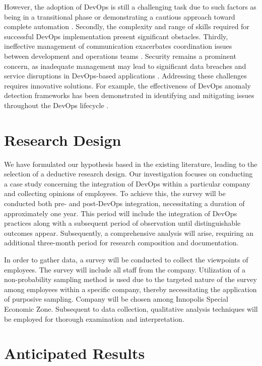\documentclass[oneside,final,12pt,a4paper]{extreport}
\begin{document}
However, the adoption of DevOps is still a challenging task due to such factors as being in a transitional phase or demonstrating a cautious approach toward complete automation \cite{12}. Secondly, the complexity and range of skills required for successful DevOps implementation present significant obstacles. Thirdly, ineffective management of communication exacerbates coordination issues between development and operations teams \cite{7}. Security remains a prominent concern, as inadequate management may lead to significant data breaches and service disruptions in DevOps-based applications \cite{14}. Addressing these challenges requires innovative solutions. For example, the effectiveness of DevOps anomaly detection frameworks has been demonstrated in identifying and mitigating issues throughout the DevOps lifecycle \cite{13}.

\section{Research Design}

We have formulated our hypothesis based in the existing literature, leading to the selection of a deductive research design. Our investigation focuses on conducting a case study concerning the integration of DevOps within a particular company and collecting opinions of employees. To achieve this, the survey will be conducted both pre- and post-DevOps integration, necessitating a duration of approximately one year. This period will include the integration of DevOps practices along with a subsequent period of observation until distinguishable outcomes appear. Subsequently, a comprehensive analysis will arise, requiring an additional three-month period for research composition and documentation.

In order to gather data, a survey will be conducted to collect the viewpoints of employees. The survey will include all staff from the company. Utilization of a non-probability sampling method is used due to the targeted nature of the survey among employees within a specific company, thereby necessitating the application of purposive sampling. Company will be chosen among Innopolis Special Economic Zone. Subsequent to data collection, qualitative analysis techniques will be employed for thorough examination and interpretation.

\section{Anticipated Results}
\end{document}
